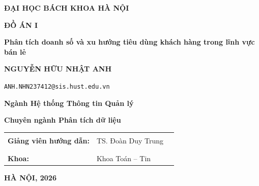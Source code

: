 \documentclass[oneside, a4paper]{book}
\theoremstyle{plain}
\theoremstyle{plain}
\theoremstyle{remark}
\theoremstyle{definition}
\theoremstyle{remark}
\renewcommand{\Large}{\fontsize{16pt}{16pt}\selectfont}
\begin{document}
	
	
\begin{titlepage}
	\thispagestyle{empty}
	
	\begin{center}
		\vspace*{0.5cm}
		
		{\bfseries\Large ĐẠI HỌC BÁCH KHOA HÀ NỘI\par}
		
		\vspace{3.5cm}
		
		{\bfseries\fontsize{24pt}{28pt}\selectfont ĐỒ ÁN I\par}
		
		\vspace{1cm}
		
		{\bfseries\fontsize{18pt}{24pt}\selectfont
			Phân tích doanh số và xu hướng tiêu dùng khách hàng trong lĩnh vực bán lẻ }
		
		\vspace{1cm}
		
		{\bfseries\Large NGUYỄN HỮU NHẬT ANH\par}
		
		{\normalsize \texttt{ANH.NHN237412@sis.hust.edu.vn}\par}
		
	
		{\bfseries Ngành Hệ thống Thông tin Quản lý\par}
		{\bfseries Chuyên ngành Phân tích dữ liệu\par}
	\end{center}
	\vspace{0.5cm}
	\vfill
	
	\noindent
\begin{tabular}{@{}p{4.3cm}p{7cm}p{4.2cm}@{}}
	\textbf{Giảng viên hướng dẫn:} 
	& TS. Đoàn Duy Trung 
	& \centering \rule{4cm}{0.4pt} \tabularnewline[-0.1cm]
	
	& 
	& \centering {\footnotesize Chữ ký của GVHD} \tabularnewline[0.3cm]
	
		\textbf{Khoa:} & Khoa Toán -- Tin & \\
\end{tabular}
	
	\vspace{3cm}
	
	\begin{center}
		{\bfseries HÀ NỘI, 2026}
	\end{center}
	
\end{titlepage}
	
\end{document}
